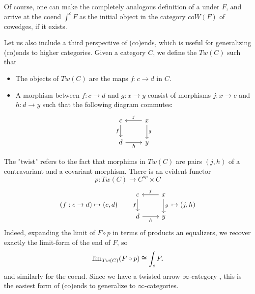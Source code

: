 Of course, one can make the completely analogous definition of a  under $F$, and arrive at the coend $\int^c F$ as the initial object in the category $coW(F)$ of cowedges, if it exists.

Let us also include a third perspective of (co)ends, which is useful for generalizing (co)ends to higher categories. Given a category $C$, we define the  $Tw(C)$ such that
\begin{itemize}
\item The objects of $Tw(C)$ are the maps $f:c\rightarrow d$ in $C$.
\item A morphism between $f:c\rightarrow d$ and $g:x\rightarrow y$ consist of morphisms $j:x\rightarrow c$ and $h:d\rightarrow y$ such that the following diagram commutes:
\[\begin{tikzcd}
c \arrow[d, "f"'] & x \arrow[d, "g"] \arrow[l, "j"'] \\
d \arrow[r, "h"'] & y                               
\end{tikzcd}\]
\end{itemize}
The "twist" refers to the fact that morphims in $Tw(C)$ are pairs $(j,h)$ of a contravariant and a covariant morphism. There is an evident functor $$p:Tw(C)\rightarrow C^{op}\times C$$ $$(f:c\rightarrow d)\mapsto (c,d)\qquad %
\begin{tikzcd}
c \arrow[d, "f"'] & x \arrow[d, "g"] \arrow[l, "j"'] \\
d \arrow[r, "h"'] & y                               
\end{tikzcd} \mapsto (j,h)$$ %
Indeed, expanding the limit of $F\circ p$ in terms of products an equalizers, we recover exactly the limit-form of the end of $F$, so
$$\text{lim}_{Tw(C)}(F\circ p)\cong \int_c F.$$
and similarly for the coend. Since we have a twisted arrow $\infty$-category \cite{HA}, this is the easiest form of (co)ends to generalize to $\infty$-categories. 

